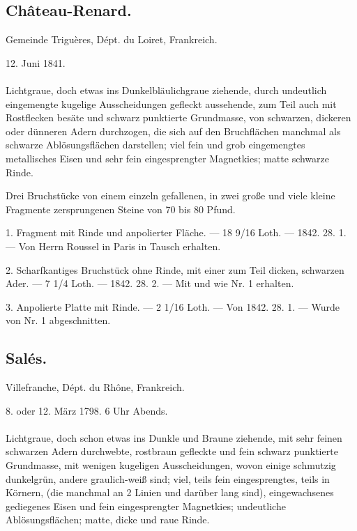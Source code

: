 \documentclass[a4paper, 11pt, oneside, polutonikogreek, german]{article}
\begin{document}
\subsection{Château-Renard.}
\begin{center}
\small
Gemeinde Triguères, Dépt. du Loiret, Frankreich.

12. Juni 1841.
\end{center}
\paragraph{}
Lichtgraue, doch etwas ins Dunkelbläulichgraue ziehende, durch undeutlich eingemengte kugelige Ausscheidungen gefleckt aussehende, zum Teil auch mit Rostflecken besäte und schwarz punktierte Grundmasse, von schwarzen, dickeren oder dünneren Adern durchzogen, die sich auf den Bruchflächen manchmal als schwarze Ablösungsflächen darstellen; viel fein und grob eingemengtes metallisches Eisen und sehr fein eingesprengter Magnetkies; matte schwarze Rinde.

Drei Bruchstücke von einem einzeln gefallenen, in zwei große und viele kleine Fragmente zersprungenen Steine von 70 bis 80 Pfund.

1. Fragment mit Rinde und anpolierter Fläche. — 18 9/16 Loth. — 1842. 28. 1. — Von Herrn Roussel in Paris in Tausch erhalten.

2. Scharfkantiges Bruchstück ohne Rinde, mit einer zum Teil dicken, schwarzen Ader. — 7 1/4 Loth. — 1842. 28. 2. — Mit und wie Nr. 1 erhalten.

3. Anpolierte Platte mit Rinde. — 2 1/16 Loth. — Von 1842. 28. 1. — Wurde von Nr. 1 abgeschnitten.
\subsection{Salés.}
\begin{center}
\small
Villefranche, Dépt. du Rhône, Frankreich.

8. oder 12. März 1798. 6 Uhr Abends.
\end{center}
\paragraph{}
Lichtgraue, doch schon etwas ins Dunkle und Braune ziehende, mit sehr feinen schwarzen Adern durchwebte, rostbraun gefleckte und fein schwarz punktierte Grundmasse, mit wenigen kugeligen Ausscheidungen, wovon einige schmutzig dunkelgrün, andere graulich-weiß sind; viel, teils fein eingesprengtes, teils in Körnern, (die manchmal an 2 Linien und darüber lang sind), eingewachsenes gediegenes Eisen und fein eingesprengter Magnetkies; undeutliche Ablösungsflächen; matte, dicke und raue Rinde.
\end{document}
